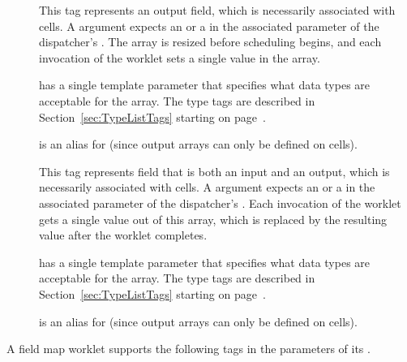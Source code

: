 \begin{description}
\item[] This tag represents an output field, which is
  necessarily associated with cells. A  argument
  expects an  or a
   in the associated parameter of the
  dispatcher's . The array is resized before scheduling
  begins, and each invocation of the worklet sets a single value in the
  array.

   has a single template parameter that specifies what
  data types are acceptable for the array. The type tags are described in
  Section~\ref{sec:TypeListTags} starting on page~\pageref{TypeTagList}.

   is an alias for  (since output
  arrays can only be defined on cells).

\item[] This tag represents field that is both an
  input and an output, which is necessarily associated with cells. A
   argument expects an 
  or a  in the associated parameter of
  the dispatcher's . Each invocation of the worklet gets a
  single value out of this array, which is replaced by the resulting value
  after the worklet completes.

   has a single template parameter that specifies
  what data types are acceptable for the array. The type tags are described
  in Section~\ref{sec:TypeListTags} starting on page~\pageref{TypeTagList}.

   is an alias for  (since output
  arrays can only be defined on cells).

  \commoncontrolsignaturetags
\end{description}

A field map worklet supports the following tags in the parameters of its
\executionsignature.

